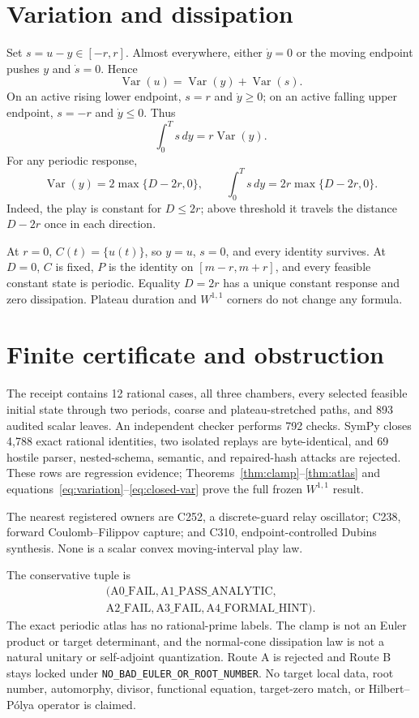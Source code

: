 \documentclass[10pt]{article}
\newcommand{\Var}{\operatorname{Var}}
\begin{document}
\section{Variation and dissipation}
Set $s=u-y\in[-r,r]$.  Almost everywhere, either $\dot y=0$ or the moving
endpoint pushes $y$ and $\dot s=0$.  Hence
\begin{equation}\label{eq:variation}
 \Var(u)=\Var(y)+\Var(s).
\end{equation}
On an active rising lower endpoint, $s=r$ and $\dot y\geq0$; on an active
falling upper endpoint, $s=-r$ and $\dot y\leq0$.  Thus
\begin{equation}\label{eq:dissipation}
 \int_0^T s\,dy=r\Var(y).
\end{equation}
For any periodic response,
\begin{equation}\label{eq:closed-var}
 \Var(y)=2\max\{D-2r,0\},\qquad
 \int_0^T s\,dy=2r\max\{D-2r,0\}.
\end{equation}
Indeed, the play is constant for $D\leq2r$; above threshold it travels the
distance $D-2r$ once in each direction.

At $r=0$, $C(t)=\{u(t)\}$, so $y=u$, $s=0$, and every identity survives.
At $D=0$, $C$ is fixed, $P$ is the identity on $[m-r,m+r]$, and every
feasible constant state is periodic.  Equality $D=2r$ has a unique constant
response and zero dissipation.  Plateau duration and $W^{1,1}$ corners do
not change any formula.

\section{Finite certificate and obstruction}
The receipt contains 12 rational cases, all three chambers, every selected
feasible initial state through two periods, coarse and plateau-stretched
paths, and 893 audited scalar leaves.  An independent checker performs 792
checks.  SymPy closes 4,788 exact rational identities, two isolated replays
are byte-identical, and 69 hostile parser, nested-schema, semantic, and
repaired-hash attacks are rejected.  These rows are regression evidence;
Theorems~\ref{thm:clamp}--\ref{thm:atlas} and
equations~\eqref{eq:variation}--\eqref{eq:closed-var} prove the full frozen
$W^{1,1}$ result.

The nearest registered owners are C252, a discrete-guard relay oscillator;
C238, forward Coulomb--Filippov capture; and C310, endpoint-controlled
Dubins synthesis.  None is a scalar convex moving-interval play law.

The conservative tuple is
\begin{gather*}
 (\mathrm{A0\_FAIL},\mathrm{A1\_PASS\_ANALYTIC},\\
 \mathrm{A2\_FAIL},\mathrm{A3\_FAIL},\mathrm{A4\_FORMAL\_HINT}).
\end{gather*}
The exact periodic atlas has no rational-prime labels.  The clamp is not an
Euler product or target determinant, and the normal-cone dissipation law is
not a natural unitary or self-adjoint quantization.  Route A is rejected and
Route B stays locked under
\texttt{NO\_BAD\_EULER\_OR\_ROOT\_NUMBER}.  No target local data, root
number, automorphy, divisor, functional equation, target-zero match, or
Hilbert--P\'olya operator is claimed.
\end{document}
